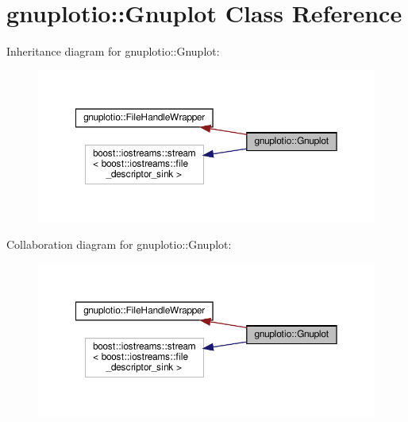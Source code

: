 \hypertarget{classgnuplotio_1_1Gnuplot}{}\section{gnuplotio\+:\+:Gnuplot Class Reference}
\label{classgnuplotio_1_1Gnuplot}


Inheritance diagram for gnuplotio\+:\+:Gnuplot\+:
\nopagebreak
\begin{figure}[H]
\begin{center}
\leavevmode
\includegraphics[width=350pt]{classgnuplotio_1_1Gnuplot__inherit__graph}
\end{center}
\end{figure}


Collaboration diagram for gnuplotio\+:\+:Gnuplot\+:
\nopagebreak
\begin{figure}[H]
\begin{center}
\leavevmode
\includegraphics[width=350pt]{classgnuplotio_1_1Gnuplot__coll__graph}
\end{center}
\end{figure}
